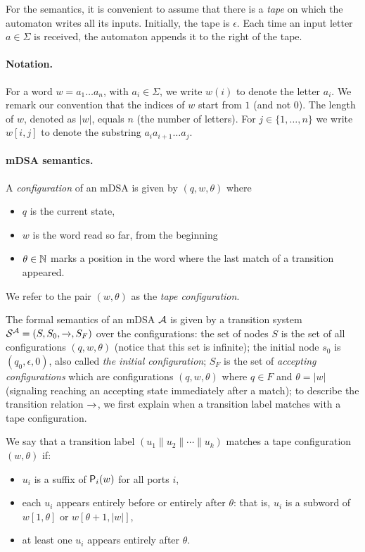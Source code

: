  For the semantics, it is convenient to assume that there is a \emph{tape} on which the automaton writes all its inputs. Initially, the tape is $\epsilon$. Each time an input letter $a \in \Sigma$ is received, the automaton appends it to the right of the tape. 
 
 \paragraph*{Notation.} For a word $w = a_1 \dots a_{n}$, with $a_i \in \Sigma$, we write $w(i)$ to denote the letter $a_i$. We remark our convention that the indices of $w$ start from $1$ (and not $0$). The length of $w$, denoted as $|w|$, equals $n$ (the number of letters). For $j \in \{1, \dots, n\}$ we write $w[i, j]$ to denote the substring $a_i a_{i+1} \dots a_j$.

  \paragraph*{mDSA semantics.} A \emph{configuration} of an mDSA is given by $(q, w, \theta)$ where
  \begin{itemize}
  \item $q$ is the current state,
  \item $w$ is the word read so far, from the beginning
  \item $\theta \in \mathbb{N}$ marks a position in the word where the last match of a transition appeared.  
  \end{itemize} 
  We refer to the pair $(w, \theta)$ as the \emph{tape configuration}.
  
  The formal semantics of an mDSA $\mathcal{A}$ is given by a transition system $\mathcal{S}^{\mathcal{A}} = (S, S_0, \xrightarrow{}, S_F)$  over the configurations: the set of nodes $S$ is  the set of all configurations $(q, w, \theta)$ (notice that this set is infinite); the initial node $s_0$ is $(q_0, \epsilon, 0)$, also called \emph{the initial configuration}; $S_F$  is the set of \emph{accepting configurations} which are configurations $(q, w, \theta)$ where $q \in F$ and $\theta = |w|$ (signaling reaching an accepting state immediately after a match); to describe the transition relation $\xrightarrow{}$, we first explain when a transition label matches with a tape configuration. 

  \begin{definition}\label{def:match}
    We say that a transition label $(u_1 \parallel u_2 \parallel \cdots \parallel u_k)$ matches a tape configuration $(w, \theta)$ if:
    \begin{itemize}
      \item $u_i$ is a suffix of $\mathsf{P}_{i}(w)$ for all ports $i$,
      \item each $u_i$ appears entirely before or entirely after $\theta$: that is, $u_i$ is a subword of $w[1, \theta]$ or $w[\theta+1, |w|]$,
      \item at least one $u_i$ appears entirely after $\theta$.
    \end{itemize}
  \end{definition}


